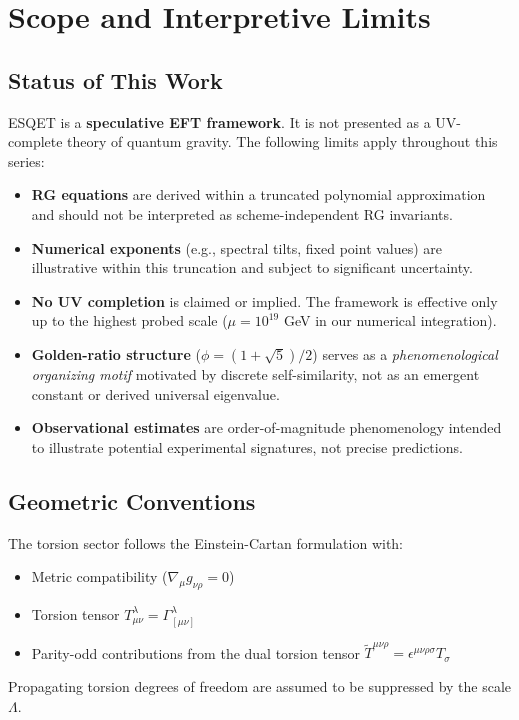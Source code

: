 \section*{Scope and Interpretive Limits}

\subsection*{Status of This Work}
ESQET is a \textbf{speculative EFT framework}. It is not presented as a UV-complete theory of quantum gravity. The following limits apply throughout this series:

\begin{itemize}
    \item \textbf{RG equations} are derived within a truncated polynomial approximation and should not be interpreted as scheme-independent RG invariants.
    \item \textbf{Numerical exponents} (e.g., spectral tilts, fixed point values) are illustrative within this truncation and subject to significant uncertainty.
    \item \textbf{No UV completion} is claimed or implied. The framework is effective only up to the highest probed scale ($\mu = 10^{19}$ GeV in our numerical integration).
    \item \textbf{Golden-ratio structure} ($\phi = (1+\sqrt{5})/2$) serves as a \textit{phenomenological organizing motif} motivated by discrete self-similarity, not as an emergent constant or derived universal eigenvalue.
    \item \textbf{Observational estimates} are order-of-magnitude phenomenology intended to illustrate potential experimental signatures, not precise predictions.
\end{itemize}

\subsection*{Geometric Conventions}
The torsion sector follows the Einstein-Cartan formulation with:
\begin{itemize}
    \item Metric compatibility ($\nabla_\mu g_{\nu\rho} = 0$)
    \item Torsion tensor $T^\lambda_{\mu\nu} = \Gamma^\lambda_{[\mu\nu]}$
    \item Parity-odd contributions from the dual torsion tensor $\tilde{T}^{\mu\nu\rho} = \epsilon^{\mu\nu\rho\sigma} T_\sigma$
\end{itemize}
Propagating torsion degrees of freedom are assumed to be suppressed by the scale $\Lambda$.


